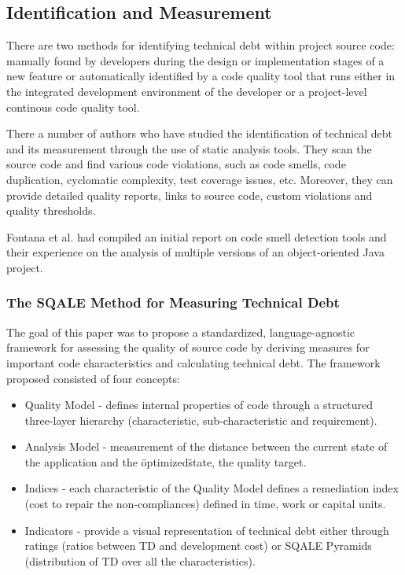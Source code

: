 \documentclass{mprop}
\begin{document}
\subsection{Identification and Measurement}

There are two methods for identifying technical debt within project source code:
manually found by developers during the design or implementation stages of a new feature or
automatically identified by a code quality tool that runs either in the integrated development environment of the developer or a project-level continous code quality tool.

There a number of authors who have studied the identification of technical debt and its measurement through the use of static analysis tools.
They scan the source code and find various code violations, such as code smells, code duplication, cyclomatic complexity, test coverage issues, etc.
Moreover, they can provide detailed quality reports, links to source code, custom violations and quality thresholds.

Fontana et al. \cite{Fontana2011} had compiled an initial report on code smell detection tools and their experience on the analysis of multiple versions of an object-oriented Java project.


\subsubsection{The SQALE Method for Measuring Technical Debt} \cite{Letouzey2012}
The goal of this paper was to propose a standardized, language-agnostic framework for assessing the quality of source code by deriving measures for important code characteristics and calculating technical debt.
The framework proposed consisted of four concepts:
\begin{itemize}
	\item Quality Model - defines internal properties of code through a structured three-layer hierarchy (characteristic, sub-characteristic and requirement).
	\item Analysis Model - measurement of the distance between the current state of the application and the \"optimized\" state, the quality target.
	\item Indices - each characteristic of the Quality Model defines a remediation index (cost to repair the non-compliances) defined in time, work or capital units.
	\item Indicators - provide a visual representation of technical debt either through ratings (ratios between TD and development cost) or SQALE Pyramids (distribution of TD over all the characteristics).
\end{itemize}
\end{document}
